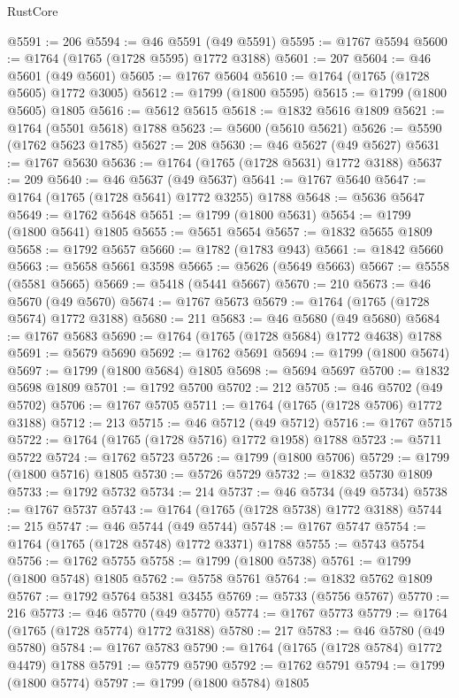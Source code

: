 \begin{lexlean}{RustCore}
\begin{coremodule}
@5591 := 206
@5594 := @46 @5591 (@49 @5591)
@5595 := @1767 @5594
@5600 := @1764 (@1765 (@1728 @5595) @1772 @3188)
@5601 := 207
@5604 := @46 @5601 (@49 @5601)
@5605 := @1767 @5604
@5610 := @1764 (@1765 (@1728 @5605) @1772 @3005)
@5612 := @1799 (@1800 @5595)
@5615 := @1799 (@1800 @5605) @1805
@5616 := @5612 @5615
@5618 := @1832 @5616 @1809
@5621 := @1764 (@5501 @5618) @1788
@5623 := @5600 (@5610 @5621)
@5626 := @5590 (@1762 @5623 @1785)
@5627 := 208
@5630 := @46 @5627 (@49 @5627)
@5631 := @1767 @5630
@5636 := @1764 (@1765 (@1728 @5631) @1772 @3188)
@5637 := 209
@5640 := @46 @5637 (@49 @5637)
@5641 := @1767 @5640
@5647 := @1764 (@1765 (@1728 @5641) @1772 @3255) @1788
@5648 := @5636 @5647
@5649 := @1762 @5648
@5651 := @1799 (@1800 @5631)
@5654 := @1799 (@1800 @5641) @1805
@5655 := @5651 @5654
@5657 := @1832 @5655 @1809
@5658 := @1792 @5657
@5660 := @1782 (@1783 @943)
@5661 := @1842 @5660
@5663 := @5658 @5661 @3598
@5665 := @5626 (@5649 @5663)
@5667 := @5558 (@5581 @5665)
@5669 := @5418 (@5441 @5667)
@5670 := 210
@5673 := @46 @5670 (@49 @5670)
@5674 := @1767 @5673
@5679 := @1764 (@1765 (@1728 @5674) @1772 @3188)
@5680 := 211
@5683 := @46 @5680 (@49 @5680)
@5684 := @1767 @5683
@5690 := @1764 (@1765 (@1728 @5684) @1772 @4638) @1788
@5691 := @5679 @5690
@5692 := @1762 @5691
@5694 := @1799 (@1800 @5674)
@5697 := @1799 (@1800 @5684) @1805
@5698 := @5694 @5697
@5700 := @1832 @5698 @1809
@5701 := @1792 @5700
@5702 := 212
@5705 := @46 @5702 (@49 @5702)
@5706 := @1767 @5705
@5711 := @1764 (@1765 (@1728 @5706) @1772 @3188)
@5712 := 213
@5715 := @46 @5712 (@49 @5712)
@5716 := @1767 @5715
@5722 := @1764 (@1765 (@1728 @5716) @1772 @1958) @1788
@5723 := @5711 @5722
@5724 := @1762 @5723
@5726 := @1799 (@1800 @5706)
@5729 := @1799 (@1800 @5716) @1805
@5730 := @5726 @5729
@5732 := @1832 @5730 @1809
@5733 := @1792 @5732
@5734 := 214
@5737 := @46 @5734 (@49 @5734)
@5738 := @1767 @5737
@5743 := @1764 (@1765 (@1728 @5738) @1772 @3188)
@5744 := 215
@5747 := @46 @5744 (@49 @5744)
@5748 := @1767 @5747
@5754 := @1764 (@1765 (@1728 @5748) @1772 @3371) @1788
@5755 := @5743 @5754
@5756 := @1762 @5755
@5758 := @1799 (@1800 @5738)
@5761 := @1799 (@1800 @5748) @1805
@5762 := @5758 @5761
@5764 := @1832 @5762 @1809
@5767 := @1792 @5764 @5381 @3455
@5769 := @5733 (@5756 @5767)
@5770 := 216
@5773 := @46 @5770 (@49 @5770)
@5774 := @1767 @5773
@5779 := @1764 (@1765 (@1728 @5774) @1772 @3188)
@5780 := 217
@5783 := @46 @5780 (@49 @5780)
@5784 := @1767 @5783
@5790 := @1764 (@1765 (@1728 @5784) @1772 @4479) @1788
@5791 := @5779 @5790
@5792 := @1762 @5791
@5794 := @1799 (@1800 @5774)
@5797 := @1799 (@1800 @5784) @1805

\end{coremodule}
\end{lexlean}

